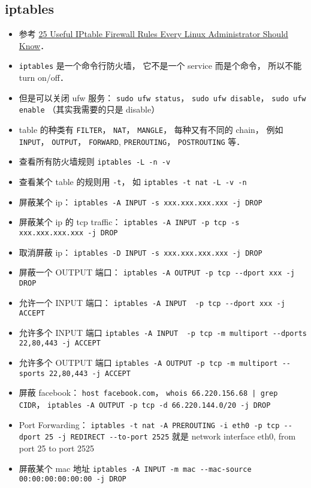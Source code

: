 \subsection{iptables}
\begin{itemize}
\item 参考 \href{https://www.tecmint.com/linux-iptables-firewall-rules-examples-commands/}{25 Useful IPtable Firewall Rules Every Linux Administrator Should Know}．
\item \verb|iptables| 是一个命令行防火墙， 它不是一个 service 而是个命令， 所以不能 turn on/off．
\item 但是可以关闭 ufw 服务： \verb|sudo ufw status|， \verb|sudo ufw disable|， \verb|sudo ufw enable| （其实我需要的只是 disable）
\item table 的种类有 \verb|FILTER|， \verb|NAT|， \verb|MANGLE|， 每种又有不同的 chain， 例如 \verb|INPUT|， \verb|OUTPUT|， \verb|FORWARD|,  \verb|PREROUTING|， \verb|POSTROUTING| 等．
\item 查看所有防火墙规则 \verb|iptables -L -n -v|
\item 查看某个 table 的规则用 \verb|-t|， 如 \verb|iptables -t nat -L -v -n|
\item 屏蔽某个 ip： \verb|iptables -A INPUT -s xxx.xxx.xxx.xxx -j DROP|
\item 屏蔽某个 ip 的 tcp traffic： \verb|iptables -A INPUT -p tcp -s xxx.xxx.xxx.xxx -j DROP|
\item 取消屏蔽 ip： \verb|iptables -D INPUT -s xxx.xxx.xxx.xxx -j DROP|
\item 屏蔽一个 OUTPUT 端口： \verb|iptables -A OUTPUT -p tcp --dport xxx -j DROP|
\item 允许一个 INPUT 端口：  \verb|iptables -A INPUT  -p tcp --dport xxx -j ACCEPT|
\item 允许多个 INPUT 端口 \verb|iptables -A INPUT  -p tcp -m multiport --dports 22,80,443 -j ACCEPT|
\item 允许多个 OUTPUT 端口 \verb|iptables -A OUTPUT -p tcp -m multiport --sports 22,80,443 -j ACCEPT|
\item 屏蔽 facebook： \verb|host facebook.com|， \verb`whois 66.220.156.68 | grep CIDR`， \verb|iptables -A OUTPUT -p tcp -d 66.220.144.0/20 -j DROP|
\item Port Forwarding： \verb|iptables -t nat -A PREROUTING -i eth0 -p tcp --dport 25 -j REDIRECT --to-port 2525| 就是 network interface eth0, from port 25 to port 2525
\item 屏蔽某个 mac 地址 \verb|iptables -A INPUT -m mac --mac-source 00:00:00:00:00:00 -j DROP|
\end{itemize}
